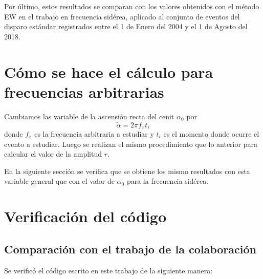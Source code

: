 

Por último, estos resultados se comparan con los valores obtenidos con el método EW en el trabajo \cite{Aab_2020} en frecuencia sidérea, aplicado al conjunto de eventos del disparo estándar registrados entre el 1 de Enero del 2004 y el 1 de Agosto del 2018. 





\section*{Cómo se hace el cálculo para frecuencias  arbitrarias}

Cambiamos las variable de la ascensión recta del cenit $\alpha_0$ por
\begin{equation}
    \tilde{\alpha} = 2\pi f_x t_i  \label{ra_arb}
  \end{equation}
donde $f_x$ es la frecuencia arbitraria a estudiar y $t_i$ es el momento donde ocurre el evento a estudiar. Luego se realizan el mismo procedimiento que lo anterior para calcular el valor de la amplitud $r$.

En la siguiente sección se verifica que se obtiene los mismo resultados con esta variable general que con el valor de $\alpha_0$ para la frecuencia sidérea.

\section*{Verificación del código}

\subsection*{Comparación con el trabajo \cite{Aab_2020} de la colaboración}
Se verificó el código escrito en este trabajo de la siguiente manera:

